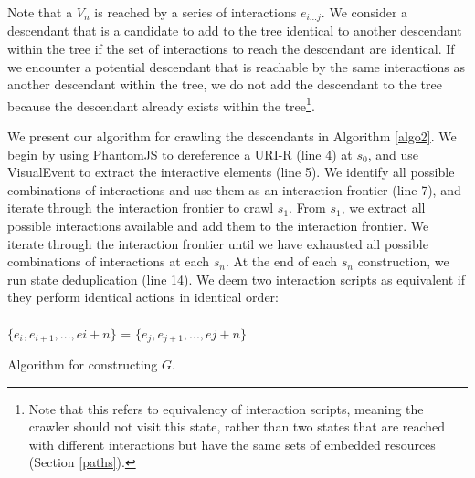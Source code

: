 \documentclass{sig-alternate}
\begin{document}
Note that a $V_n$ is reached by a series of interactions $e_{i...j}$. We consider a descendant that is a candidate to add to the tree identical to another descendant within the tree if the set of interactions to reach the descendant are identical. If we encounter a potential descendant that is reachable by the same interactions as another descendant within the tree, we do not add the descendant to the tree because the descendant already exists within the tree\footnote{Note that this refers to equivalency of interaction scripts, meaning the crawler should not visit this state, rather than two states that are reached with different interactions but have the same sets of embedded resources (Section \ref{paths}).}.

We present our algorithm for crawling the descendants in Algorithm \ref{algo2}. We begin by using PhantomJS to dereference a URI-R (line 4) at $s_0$, and use VisualEvent to extract the interactive elements (line 5). We identify all possible combinations of interactions and use them as an interaction frontier (line 7), and iterate through the interaction frontier to crawl $s_1$. From $s_1$, we extract all possible interactions available and add them to the interaction frontier. We iterate through the interaction frontier until we have exhausted all possible combinations of interactions at each $s_n$. At the end of each $s_n$ construction, we run state deduplication (line 14). We deem two interaction scripts as equivalent if they perform identical actions in identical order:
\\ \\
\noindent$\{e_{i}, e_{i+1}, ..., e{i+n}\}$ = $\{e_{j}, e_{j+1}, ..., e{j+n}\}$

\begin{algorithm}
 \caption{Algorithm for constructing $G$.}
  \label{algo2}
\end{algorithm}
\end{document}
